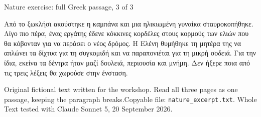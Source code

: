 \documentclass[aspectratio=169,10pt]{beamer}
\newcommand{\source}[1]{\vfill{\scriptsize\color{slate}#1\par}}
\begin{document}
\begin{frame}{Nature exercise: full Greek passage, 3 of 3}
\normalsize\raggedright\setlength{\parskip}{5pt}
Από το ξωκλήσι ακούστηκε η καμπάνα και μια ηλικιωμένη γυναίκα σταυροκοπήθηκε. Λίγο πιο πέρα, ένας εργάτης έδενε κόκκινες κορδέλες στους κορμούς των ελιών που θα κόβονταν για να περάσει ο νέος δρόμος. Η Ελένη θυμήθηκε τη μητέρα της να απλώνει τα δίχτυα για τη συγκομιδή και να παραπονιέται για τη μικρή σοδειά. Για την ίδια, εκείνα τα δέντρα ήταν μαζί δουλειά, περιουσία και μνήμη. Δεν ήξερε ποια από τις τρεις λέξεις θα χωρούσε στην ένσταση.
\source{Original fictional text written for the workshop. Read all three pages as one passage, keeping the paragraph breaks.\newline Copyable file: \texttt{nature\_excerpt.txt}. Whole Text tested with Claude Sonnet 5, 20 September 2026.}
\end{frame}
\end{document}
